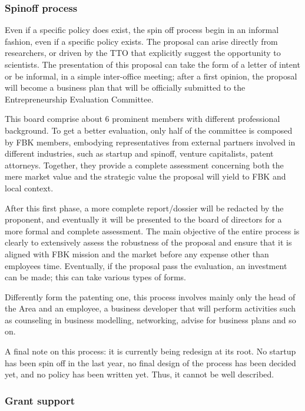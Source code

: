 \subsubsection{Spinoff process}

Even if a specific policy does exist, the spin off process begin in an informal fashion, even if a specific policy exists. The proposal can arise directly from researchers, or driven by the TTO that explicitly suggest the opportunity to scientists. The presentation of this proposal can take the form of a letter of intent or be informal, in a simple inter-office meeting; after a first opinion, the proposal will become a business plan that will be officially submitted to the Entrepreneurship Evaluation Committee. 

This board comprise about 6 prominent members with different professional background. To get a better evaluation, only half of the committee is composed by FBK members, embodying representatives from external partners involved in different industries, such as startup and spinoff, venture capitalists, patent attorneys. Together, they provide a complete assessment concerning both the mere market value and the strategic value the proposal will yield to FBK and local context.

After this first phase, a more complete report/dossier will be redacted by the proponent, and eventually it will be presented to the board of directors for a more formal and complete assessment. The main objective of the entire process is clearly to extensively assess the robustness of the proposal and ensure that it is aligned with FBK mission and the market before any expense other than employees time. Eventually, if the proposal pass the evaluation, an investment can be made; this can take various types of forms.

Differently form the patenting one, this process involves mainly only the head of the Area and an employee, a business developer that will perform activities such as counseling in business modelling, networking, advise for business plans and so on. 

A final note on this process: it is currently being redesign at its root. No startup has been spin off in the last year, no final design of the process has been decided yet, and no policy has been written yet. Thus, it cannot be well described. 

\subsubsection{Grant support}

